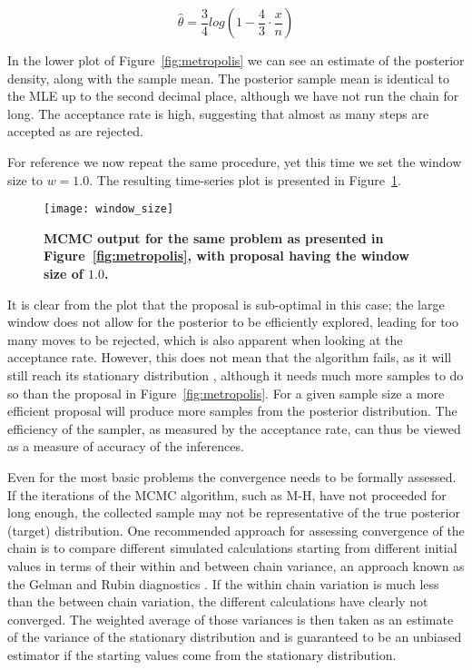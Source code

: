 \begin{equation}
\hat{\theta}=\frac{3}{4}log\left(1-\frac{4}{3}\cdot\frac{x}{n}\right)
\label{eq:mle}
\end{equation}

In the lower plot of Figure~\ref{fig:metropolis} we can see an estimate of the posterior density, along with the sample mean.
The posterior sample mean is identical to the MLE up to the second decimal place, although we have not run the chain for long.
The acceptance rate is high, suggesting that almost as many steps are accepted as are rejected.

For reference we now repeat the same procedure, yet this time we set the window size to $w=1.0$.
The resulting time-series plot is presented in Figure~\ref{fig:window_size}.

\begin{figure}[H]
\centering
\texttt{[image: window\_size]} 
\caption{
{ \footnotesize 
{\bf MCMC output for the same problem as presented in Figure~\ref{fig:metropolis}, with proposal having the window size of $1.0$.}
}%
}
\label{fig:window_size}
\end{figure}

It is clear from the plot that the proposal is sub-optimal in this case; the large window does not allow for the posterior to be efficiently explored, leading for too many moves to be rejected, which is also apparent when looking at the acceptance rate.
However, this does not mean that the algorithm fails, as it will still reach its stationary distribution \citep{Tierney1994}, although it needs much more samples to do so than the proposal in Figure~\ref{fig:metropolis}. 
For a given sample size a more efficient proposal will produce more samples from the posterior distribution.
The efficiency of the sampler, as measured by the acceptance rate, can thus be viewed as a measure of accuracy of the inferences.

Even for the most basic problems the convergence needs to be formally assessed.
If the iterations of the MCMC algorithm, such as M-H, have not proceeded for long enough, the collected sample may not be representative of the true posterior (target) distribution.
One recommended approach for assessing convergence of the chain is to compare different simulated calculations starting from different initial values in terms of their within and between chain variance, an approach known as the Gelman and Rubin diagnostics \citep{Cowles1996}. 
If the within chain variation is much less than the between chain variation, the different calculations have clearly not converged.
The weighted average of those variances is then taken as an estimate of the variance of the stationary distribution and is guaranteed to be an unbiased estimator if the starting values come from the stationary distribution.

